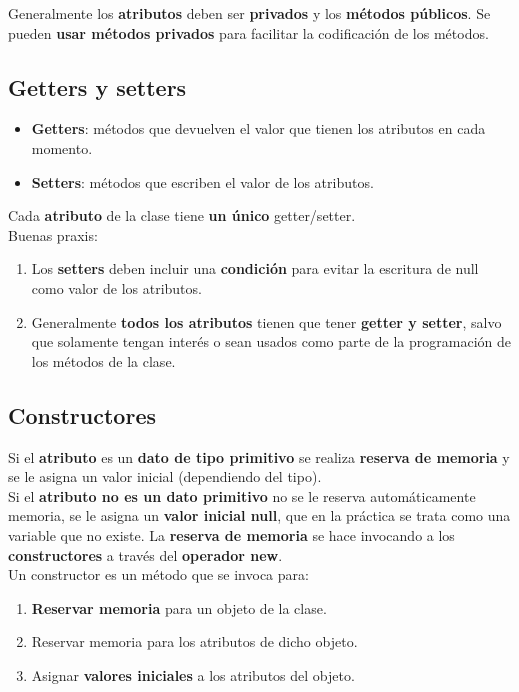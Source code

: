 \documentclass{article}
\begin{document}
Generalmente los \textbf{atributos} deben ser \textbf{privados} y los \textbf{métodos públicos}. Se pueden \textbf{usar métodos privados} para facilitar la codificación de los métodos. 

\subsection{Getters y setters}
\begin{itemize}
    \item \textbf{Getters}: métodos que devuelven el valor que tienen los atributos en cada momento.
    \item \textbf{Setters}: métodos que escriben el valor de los atributos.
\end{itemize}
Cada \textbf{atributo} de la clase tiene \textbf{un único} getter/setter. \\
Buenas praxis:
\begin{enumerate}
    \item Los \textbf{setters} deben incluir una \textbf{condición} para evitar la escritura de null como valor de los atributos.
    \item Generalmente \textbf{todos los atributos} tienen que tener \textbf{getter y setter}, salvo que solamente tengan interés o sean usados como parte de la programación de los métodos de la clase.
\end{enumerate}

\newpage

\subsection{Constructores}
Si el \textbf{atributo} es un \textbf{dato de tipo primitivo} se realiza \textbf{reserva de memoria} y se le asigna un valor inicial (dependiendo del tipo). \\
Si el \textbf{atributo no es un dato primitivo} no se le reserva automáticamente memoria, se le asigna un \textbf{valor inicial null}, que en la práctica se trata como una variable que no existe. La \textbf{reserva de memoria} se hace invocando a los \textbf{constructores} a través del \textbf{operador new}. \\

Un constructor es un método que se invoca para:
\begin{enumerate}
    \item \textbf{Reservar memoria} para un objeto de la clase.
    \item Reservar memoria para los atributos de dicho objeto.
    \item Asignar \textbf{valores iniciales} a los atributos del objeto.
\end{enumerate}
\end{document}
